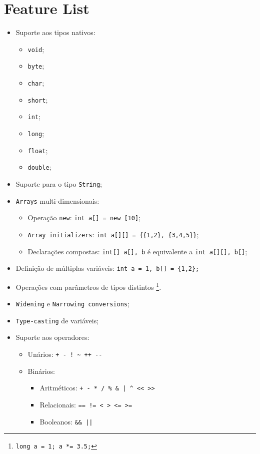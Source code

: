 \documentclass[a4paper]{article}
\begin{document}
\section{Feature List}
\begin{itemize}
	\item Suporte aos tipos nativos:
	\begin{itemize}
		\item \texttt{void};
		\item \texttt{byte};
		\item \texttt{char};
		\item \texttt{short};
		\item \texttt{int};
		\item \texttt{long};
		\item \texttt{float};
		\item \texttt{double};
	\end{itemize}
	\item Suporte para o tipo \texttt{String};
	\item \texttt{Arrays} multi-dimensionais:
	\begin{itemize}
		\item Operação \texttt{new}: \quad \texttt{int a[] = new [10]};
		\item \texttt{Array initializers}: \quad \texttt{int a[][] = \{\{1,2\}, \{3,4,5\}\}};
		\item Declarações compostas: \quad \texttt{int[] a[], b} é equivalente a \texttt{int a[][], b[]};
	\end{itemize}
	\item Definição de múltiplas variáveis: \quad \texttt{int a = 1, b[] = \{1,2\}; }
	\item Operações com parâmetros de tipos distintos \footnote[1]{\texttt{long a = 1; a *= 3.5;}}.
	\item \texttt{Widening} e \texttt{Narrowing conversions};
	\item \texttt{Type-casting} de variáveis;
	\item Suporte aos operadores:
	\begin{itemize}
		\item Unários: \quad \verb|+ - ! ~ ++ --|
		\item Binários:
		\begin{itemize}
			\item Aritméticos: \quad \verb!+ - * / % & | ^ << >>!
			\item Relacionais: \quad \verb|== != < > <= >=|
			\item Booleanos: \quad \verb!&& ||!

\end{itemize}
\end{itemize}
\end{itemize}
\end{document}
